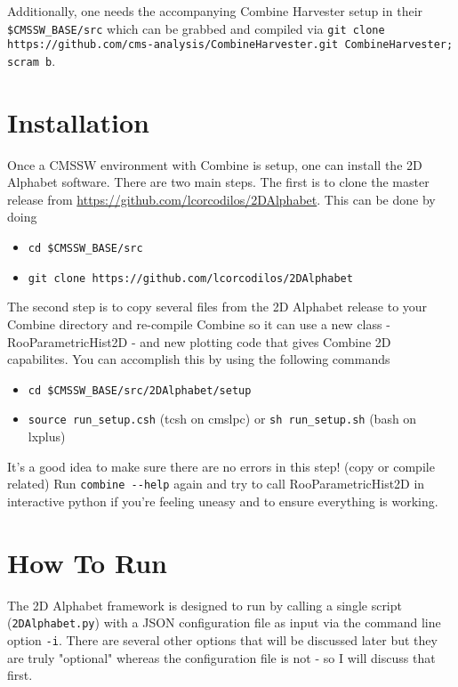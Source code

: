 \documentclass[letter]{article}
\begin{document}
    Additionally, one needs the accompanying Combine Harvester setup in their \verb"$CMSSW_BASE/src" which can be grabbed and compiled via \verb"git clone https://github.com/cms-analysis/CombineHarvester.git CombineHarvester; scram b".

\section{Installation}

    Once a CMSSW environment with Combine is setup, one can install the 2D Alphabet software. There are two main steps. The first is to clone the master release from \url{https://github.com/lcorcodilos/2DAlphabet}. This can be done by doing
    \begin{itemize}
        \item \verb"cd $CMSSW_BASE/src"
        \item \verb"git clone https://github.com/lcorcodilos/2DAlphabet"
    \end{itemize}
    
    The second step is to copy several files from the 2D Alphabet release to your Combine directory and re-compile Combine so it can use a new class - RooParametricHist2D - and new plotting code that gives Combine 2D capabilites. You can accomplish this by using the following commands
    \begin{itemize}
        \item \verb"cd $CMSSW_BASE/src/2DAlphabet/setup"
        \item \verb"source run_setup.csh" (tcsh on cmslpc) or \verb"sh run_setup.sh" (bash on lxplus)
    \end{itemize}

    It's a good idea to make sure there are no errors in this step! (copy or compile related) Run \verb"combine --help" again and try to call RooParametricHist2D in interactive python if you're feeling uneasy and to ensure everything is working. 

\section{How To Run}
    The 2D Alphabet framework is designed to run by calling a single script (\verb"2DAlphabet.py") with a JSON configuration file as input via the command line option \verb"-i". There are several other options that will be discussed later but they are truly "optional" whereas the configuration file is not - so I will discuss that first.
\end{document}
